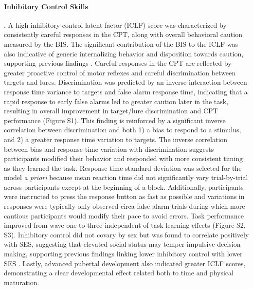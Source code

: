 \documentclass{article}%
\begin{document}
\paragraph*{Inhibitory Control Skills}. A high inhibitory control latent factor (ICLF) score was characterized by consistently careful responses in the CPT, along with overall behavioral caution measured by the BIS. The significant contribution of the BIS to the ICLF was also indicative of generic internalizing behavior and disposition towards caution, supporting previous findings \citep{malloy2007impulsive,loree2015impulsivity}. Careful responses in the CPT are reflected by greater proactive control of motor reflexes and careful discrimination between targets and lures. Discrimination was predicted by an inverse interaction between response time variance to targets and false alarm response time, indicating that a rapid response to early false alarms led to greater caution later in the task, resulting in overall improvement in target/lure discrimination and CPT performance (Figure S1). This finding is reinforced by a significant inverse correlation between discrimination and both 1) a bias to respond to a stimulus, and 2) a greater response time variation to targets. The inverse correlation between bias and response time variation with discrimination suggests participants modified their behavior and responded with more consistent timing as they learned the task. Response time standard deviation was selected for the model \textit{a priori} because mean reaction time did not significantly vary trial-by-trial across participants except at the beginning of a block. Additionally, participants were instructed to press the response button as fast as possible and variations in responses were typically only observed circa false alarm trials during which more cautious participants would modify their pace to avoid errors. Task performance improved from wave one to three independent of task learning effects (Figure S2, S3). Inhibitory control did not covary by sex but was found to correlate positively with SES, suggesting that elevated social status may temper impulsive decision-making, supporting previous findings linking lower inhibitory control with lower SES \citep{spielberg2015adolescent}. Lastly, advanced pubertal development also indicated greater ICLF scores, demonstrating a clear developmental effect related both to time and physical maturation.
\end{document}
